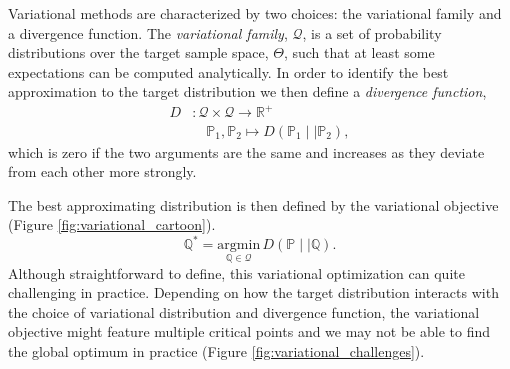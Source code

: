 \documentclass[11pt, oneside]{article}
\newcommand{\PP}{ \mathbb{P} }
\begin{document}
Variational methods are characterized by two choices: the variational
family and a divergence function. The \emph{variational family}, 
$\mathcal{Q}$, is a set of probability distributions over the target sample 
space, $\Theta$, such that at least some expectations can be computed
analytically.  In order to identify the best approximation to the target 
distribution we then define a \emph{divergence function},
%
\begin{align*}
D &: 
\mathcal{Q} \times \mathcal{Q}
\rightarrow \mathbb{R}^{+}
\\
& \quad \PP_{1}, \PP_{2} 
\mapsto D \! \left( \PP_{1} \mid\mid \PP_{2} \right),
\end{align*}
%
which is zero if the two arguments are the same and increases as they 
deviate from each other more strongly.

The best approximating distribution is then defined by the variational 
objective (Figure \ref{fig:variational_cartoon}).
%
\begin{equation*}
\mathbb{Q}^{*}
= 
\underset{\mathbb{Q} \in \mathcal{Q}}{\mathrm{argmin}} \,
D \! \left( \PP \mid\mid \mathbb{Q} \right).
\end{equation*}
%
Although straightforward to define, this variational optimization can
quite challenging in practice.  Depending on how the target distribution
interacts with the choice of variational distribution and divergence
function, the variational objective might feature multiple critical points
and we may not be able to find the global optimum in practice
(Figure \ref{fig:variational_challenges}).
\end{document}

